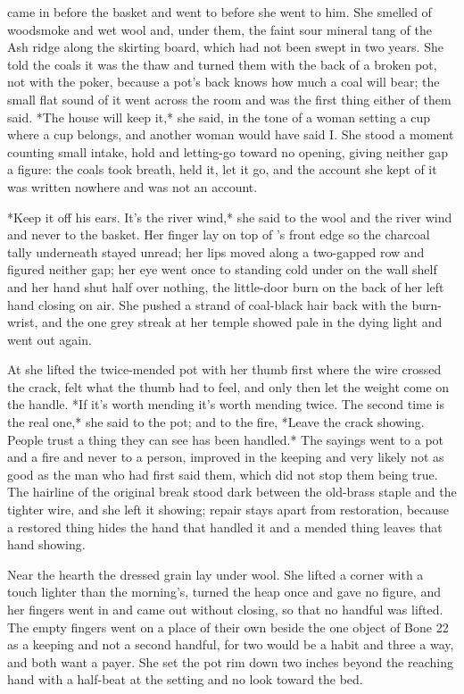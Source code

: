  came in before the basket and went to  before she went to him. She smelled of woodsmoke and wet wool and, under them, the faint sour mineral tang of the Ash ridge along the skirting board, which had not been swept in two years. She told the coals it was the thaw and turned them with the back of a broken pot, not with the poker, because a pot's back knows how much a coal will bear; the small flat sound of it went across the room and was the first thing either of them said. *The house will keep it,* she said, in the tone of a woman setting a cup where a cup belongs, and another woman would have said I. She stood a moment counting small intake, hold and letting-go toward no opening, giving neither gap a figure: the coals took breath, held it, let it go, and the account she kept of it was written nowhere and was not an account.

*Keep it off his ears. It's the river wind,* she said to the wool and the river wind and never to the basket. Her finger lay on top of 's front edge so the charcoal tally underneath stayed unread; her lips moved along a two-gapped row and figured neither gap; her eye went once to  standing cold under  on the wall shelf and her hand shut half over nothing, the little-door burn on the back of her left hand closing on air. She pushed a strand of coal-black hair back with the burn-wrist, and the one grey streak at her temple showed pale in the dying light and went out again.

At  she lifted the twice-mended pot with her thumb first where the wire crossed the crack, felt what the thumb had to feel, and only then let the weight come on the handle. *If it's worth mending it's worth mending twice. The second time is the real one,* she said to the pot; and to the fire, *Leave the crack showing. People trust a thing they can see has been handled.* The sayings went to a pot and a fire and never to a person, improved in the keeping and very likely not as good as the man who had first said them, which did not stop them being true. The hairline of the original break stood dark between the old-brass staple and the tighter wire, and she left it showing; repair stays apart from restoration, because a restored thing hides the hand that handled it and a mended thing leaves that hand showing.

Near the hearth the dressed grain lay under wool. She lifted a corner with a touch lighter than the morning's, turned the heap once and gave no figure, and her fingers went in and came out without closing, so that no handful was lifted. The empty fingers went on a place of their own beside the one object of Bone 22 as a keeping and not a second handful, for two would be a habit and three a way, and both want a payer. She set the pot rim down two inches beyond the reaching hand with a half-beat at the setting and no look toward the bed.


